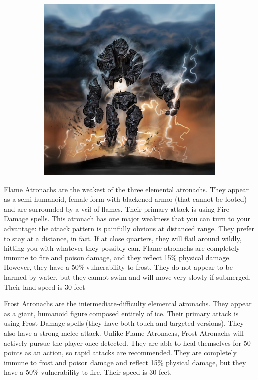 \documentclass[12pt]{book}
\begin{document}
\begin{figure}[h]
\begin{subfigure}{0.3\textwidth}
	\end{subfigure}
	\begin{subfigure}{0.3\textwidth}
		\centering
		\includegraphics[scale=0.45]{stormatronach.png}
	\end{subfigure}
\end{figure}

Flame Atronachs are the weakest of the three elemental atronachs. They appear as a semi-humanoid, female form with blackened armor (that cannot be looted) and are surrounded by a veil of flames. Their primary attack is using Fire Damage spells. This atronach has one major weakness that you can turn to your advantage: the attack pattern is painfully obvious at distanced range. They prefer to stay at a distance, in fact. If at close quarters, they will flail around wildly, hitting you with whatever they possibly can. Flame atronachs are completely immune to fire and poison damage, and they reflect 15\% physical damage. However, they have a 50\% vulnerability to frost. They do not appear to be harmed by water, but they cannot swim and will move very slowly if submerged. Their land speed is 30 feet.

Frost Atronachs are the intermediate-difficulty elemental atronachs. They appear as a giant, humanoid figure composed entirely of ice. Their primary attack is using Frost Damage spells (they have both touch and targeted versions). They also have a strong melee attack. Unlike Flame Atronachs, Frost Atronachs will actively pursue the player once detected. They are able to heal themselves for 50 points as an action, so rapid attacks are recommended. They are completely immune to frost and poison damage and reflect 15\% physical damage, but they have a 50\% vulnerability to fire. Their speed is 30 feet.
\end{document}
